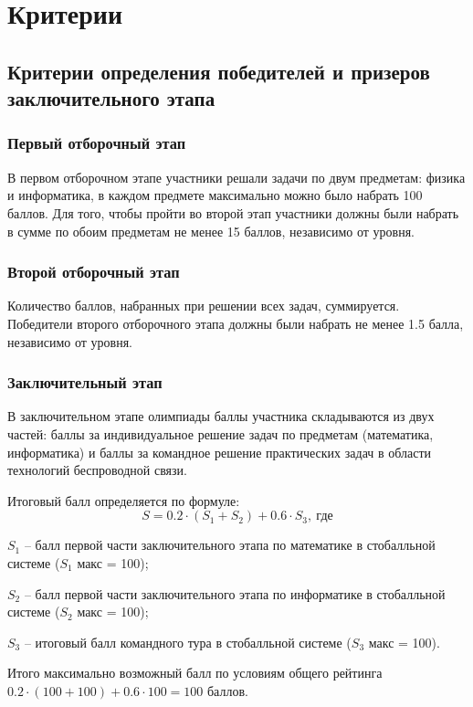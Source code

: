 \part{Критерии}

\chapter{Критерии определения победителей и призеров заключительного этапа}

\section{Первый отборочный этап}

В первом отборочном этапе участники решали задачи по двум предметам: физика и информатика, в каждом предмете максимально можно было набрать 100 баллов. Для того, чтобы пройти во второй этап участники  должны были набрать в сумме по обоим предметам не менее 15 баллов, независимо от уровня.

\section{Второй отборочный этап}

Количество баллов, набранных при решении всех задач, суммируется. 
Победители второго отборочного этапа должны были набрать не менее 1.5 балла, независимо от уровня.

\section{Заключительный этап}

В заключительном этапе олимпиады баллы участника складываются из двух частей: баллы за индивидуальное решение задач по предметам (математика, информатика) и баллы за командное решение практических задач в области технологий беспроводной связи.

Итоговый балл определяется по формуле: $$S = 0.2 \cdot (S_1+S_2) + 0.6 \cdot S_3, \: \text{где}$$

$S_1$ – балл первой части заключительного этапа по математике в стобалльной системе ($S_1$ макс = 100);

$S_2$ – балл первой части заключительного этапа по информатике в стобалльной системе ($S_2$ макс = 100);

$S_3$ – итоговый балл командного тура в стобалльной системе ($S_3$ макс = 100).

Итого максимально возможный балл по условиям общего рейтинга $0.2 \cdot (100+100) + 0.6 \cdot 100 = 100$ баллов.

